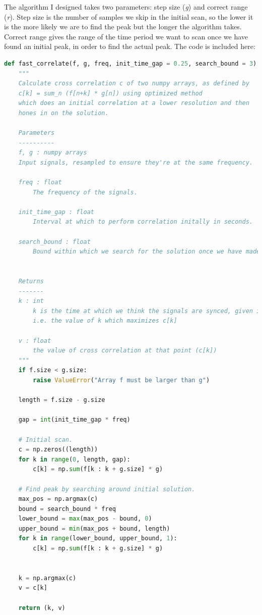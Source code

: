 \documentclass[12pt,a4paper,twoside,openany]{report}
\begin{document}
The algorithm I designed takes two parameters: step size (\emph{g}) and
correct range (\emph{r}). Step size is the number of samples we skip in the initial scan, so the
lower it is the more likely we are to find the peak but the longer the
algorithm takes. Correct range gives the range of the time period we want to
scan once we have found an initial peak, in order to find the actual peak. The
code is included here:
\begin{lstlisting}[language=Python]
def fast_correlate(f, g, freq, init_time_gap = 0.25, search_bound = 3):
    """
    Calculate cross correlation c of two numpy arrays, as defined by 
    c[k] = sum_n (f[n+k] * g[n]) using optimized method 
    which does an initial correlation at a lower resolution and then 
    hones in on the solution.

    Parameters
    ----------
    f, g : numpy arrays
    Input signals, resampled to ensure they're at the same frequency.

    freq : float
        The frequency of the signals.

    init_time_gap : float
        Interval at which to perform correlation initally in seconds. 

    search_bound : float
        Bound within which we search for the solution once we have made an initial pass.
        

    Returns
    -------
    k : int
        k is the time at which we think the signals are synced, given in terms of the number of samples through f we are.
        i.e. the value of k which maximizes c[k]

    v : float
        the value of cross correlation at that point (c[k])
    """
    if f.size < g.size:
        raise ValueError("Array f must be larger than g")

    length = f.size - g.size

    gap = int(init_time_gap * freq)

    # Initial scan.
    c = np.zeros((length))
    for k in range(0, length, gap):
        c[k] = np.sum(f[k : k + g.size] * g)

    # Find peak by searching around initial solution.
    max_pos = np.argmax(c)
    bound = search_bound * freq
    lower_bound = max(max_pos - bound, 0)
    upper_bound = min(max_pos + bound, length)
    for k in range(lower_bound, upper_bound, 1):
        c[k] = np.sum(f[k : k + g.size] * g)


    k = np.argmax(c)
    v = c[k]

    return (k, v)
\end{lstlisting}
\end{document}
